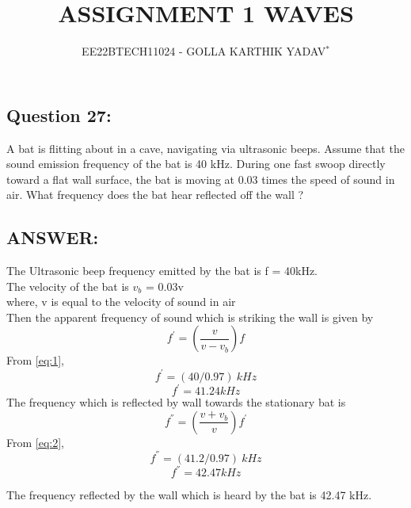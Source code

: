 \documentclass[journal,12pt,twocolumn]{IEEEtran}
\theoremstyle{remark}
\begin{document}

\vspace{3cm}

\title{ASSIGNMENT 1 WAVES}
\author{EE22BTECH11024 - GOLLA KARTHIK YADAV$^{*}$%
}
\maketitle
\newpage
\bigskip

\renewcommand{\thefigure}{\theenumi}
\renewcommand{\thetable}{\theenumi}


\maketitle

\subsection*{Question 27:}
A bat is flitting about in a cave, navigating via ultrasonic beeps. Assume that the sound emission frequency of the bat is 40 kHz. During one fast swoop directly toward a flat wall surface, the bat is moving at 0.03 times the speed of sound in air. What frequency does the bat hear reflected off the wall ?
\subsection*{ANSWER:}
The Ultrasonic beep frequency emitted by the bat is
\bigskip
f = 40kHz. \\

The velocity of the bat is $v_b$ = 0.03v \\

where, v is equal to the velocity of sound in air\\

Then the apparent frequency of sound which is striking the wall is given by \\
\begin{equation}\label{eq:1} f^{'}= (\frac{v}{v-v_b})f\end{equation}
From \ref{eq:1},
\[ f^{'} = (40/0.97)\:kHz \]
$$ {f^{'} = 41.24kHz} $$
The frequency which is reflected by wall towards the stationary bat is \\
\begin{equation}\label{eq:2} f^{''}= (\frac{v+v_b}{v})f^{'}\end{equation}
From \ref{eq:2},
$$ f^{''} = (41.2/0.97)\:kHz $$
$$ f^{''} = 42.47kHz $$
\bigskip

The frequency reflected by the wall which is heard by the bat is 42.47 kHz.
\end{document}
